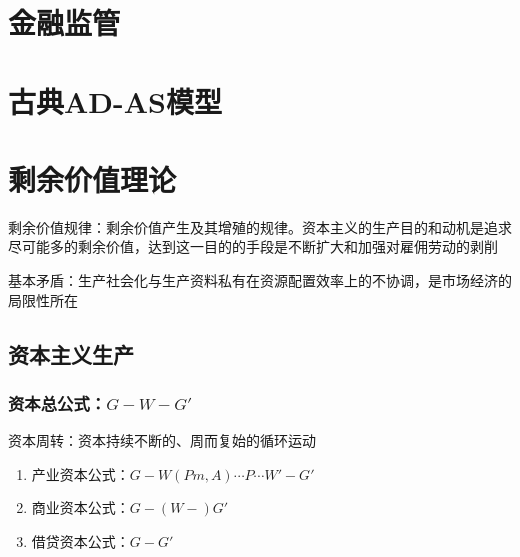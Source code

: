 \documentclass[12pt]{book}
\begin{document}
\chapter{金融监管}









\chapter{古典AD-AS模型}\label{chapter:古典AD-AS模型}


\chapter{剩余价值理论}




剩余价值规律：剩余价值产生及其增殖的规律。资本主义的生产目的和动机是追求尽可能多的剩余价值，达到这一目的的手段是不断扩大和加强对雇佣劳动的剥削

基本矛盾：生产社会化与生产资料私有在资源配置效率上的不协调，是市场经济的局限性所在




\section{资本主义生产}






\subsection{资本总公式：$G-W-G'$}

\par 资本周转：资本持续不断的、周而复始的循环运动
\begin{enumerate}[(1)]
    \item 产业资本公式：$G-W(Pm,A)\cdots P\cdots W′-G′$
    \item 商业资本公式：$G-(W-)G'$
    \item 借贷资本公式：$G-G'$
\end{enumerate}
\end{document}
